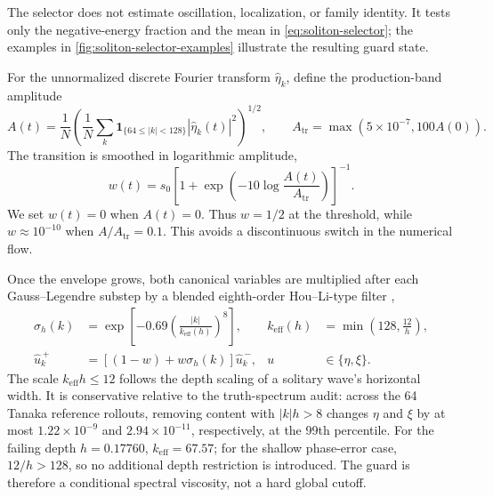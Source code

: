 The selector does not estimate oscillation, localization, or family identity.
It tests only the negative-energy fraction and the mean in
\eqref{eq:soliton-selector}; the examples in
\cref{fig:soliton-selector-examples} illustrate the resulting guard state.

For the unnormalized discrete Fourier transform $\widehat\eta_k$, define the
production-band amplitude
\begin{equation}
  A(t)=\frac{1}{N}
  \left(\frac{1}{N}\sum_k
  \mathbf 1_{\{64\leq |k|<128\}}|\widehat\eta_k(t)|^2\right)^{1/2},
  \qquad
  A_{\mathrm{tr}}=\max\!\left(5\times10^{-7},100A(0)\right).
  \label{eq:guard-amplitude}
\end{equation}
The transition is smoothed in logarithmic amplitude,
\begin{equation}
  w(t)=s_0
  \left[1+\exp\!\left(-10\log\frac{A(t)}{A_{\mathrm{tr}}}\right)\right]^{-1}.
  \label{eq:guard-weight}
\end{equation}
We set \(w(t)=0\) when \(A(t)=0\). Thus $w=1/2$ at the threshold, while
$w\approx10^{-10}$ when
$A/A_{\mathrm{tr}}=0.1$. This avoids a discontinuous switch in the numerical
flow.

Once the envelope grows, both canonical variables are multiplied after each
Gauss--Legendre substep by a blended eighth-order Hou--Li-type filter
\cite{hou2007},
\begin{align}
  \sigma_h(k)
  &=\exp\!\left[-0.69
    \left(\frac{|k|}{k_{\mathrm{eff}}(h)}\right)^8\right],
  &k_{\mathrm{eff}}(h)&=\min\!\left(128,\frac{12}{h}\right),
  \label{eq:depth-houli}\\
  \widehat u_k^{\,+}
  &=\left[(1-w)+w\sigma_h(k)\right]\widehat u_k^{\,-},
  &u&\in\{\eta,\xi\}.
  \label{eq:guard-update}
\end{align}
The scale $k_{\mathrm{eff}}h\leq12$ follows the depth scaling of a solitary
wave's horizontal width. It is conservative relative to the truth-spectrum
audit: across the 64 Tanaka reference rollouts, removing content with
$|k|h>8$ changes $\eta$ and $\xi$ by at most
$1.22\times10^{-9}$ and $2.94\times10^{-11}$, respectively, at the 99th
percentile. For the failing depth $h=0.17760$,
$k_{\mathrm{eff}}=67.57$; for the shallow phase-error case,
$12/h>128$, so no additional depth restriction is introduced. The guard is
therefore a conditional spectral viscosity, not a hard global cutoff.
